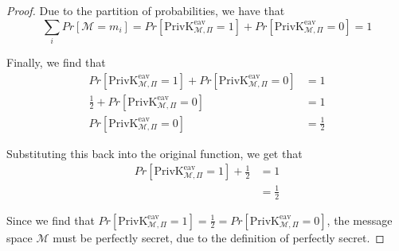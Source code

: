 \documentclass{article}
\begin{document}
\begin{enumerate}
\begin{enumerate}
\begin{proof}
          Due to the partition of probabilities, we have that
          \[
            \sum\limits_i Pr[\mathcal{M} = m_i] =  
            Pr[\text{PrivK}_{\mathcal{M}, \Pi}^{\text{eav}} = 1] + 
            Pr[\text{PrivK}_{\mathcal{M}, \Pi}^{\text{eav}} = 0] = 1
          \]

          Finally, we find that
          \begin{align*}
            Pr[\text{PrivK}_{\mathcal{M}, \Pi}^{\text{eav}} = 1] + 
            Pr[\text{PrivK}_{\mathcal{M}, \Pi}^{\text{eav}} = 0] &= 1\\
            \frac{1}{2} + Pr[\text{PrivK}_{\mathcal{M}, \Pi}^{\text{eav}} = 0] &= 1\\
            Pr[\text{PrivK}_{\mathcal{M}, \Pi}^{\text{eav}} = 0] &= \frac{1}{2}
          \end{align*}

          Substituting this back into the original function, we get that
          \begin{align*}
            Pr[\text{PrivK}_{\mathcal{M}, \Pi}^{\text{eav}} = 1] 
            + \frac{1}{2} &= 1\\
                          &= \frac{1}{2}
          \end{align*}

          Since we find that $Pr[\text{PrivK}_{\mathcal{M}, \Pi}^{\text{eav}} =
          1] = \frac{1}{2} = Pr[\text{PrivK}_{\mathcal{M}, \Pi}^{\text{eav}} =
          0]$, the message space $\mathcal{M}$ must be perfectly secret, due to
          the definition of perfectly secret.
        \end{proof}
    \end{enumerate}
\end{enumerate}
\end{document}
